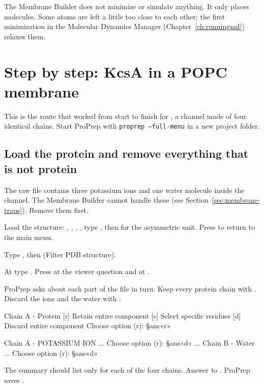 \begin{behindscenes}
The Membrane Builder does not minimize or simulate anything. It only places
molecules. Some atoms are left a little too close to each other; the first
minimization in the Molecular Dynamics Manager (Chapter~\ref{ch:runningmd})
relaxes them.
\end{behindscenes}

\section{Step by step: KcsA in a POPC membrane}
\label{sec:membrane-steps}

This is the route that worked from start to finish for , a channel
made of four identical chains. Start ProPrep with \texttt{proprep --full-menu}
in a new project folder.

\subsection{Load the protein and remove everything that is not protein}
\label{sec:membrane-filter}

The raw  file contains three potassium ions and one water molecule
inside the channel. The Membrane Builder cannot handle these (see
Section~\ref{sec:membrane-traps}). Remove them first.

\begin{steps}
  \item Load the structure: , , , , type
        , then  for the asymmetric unit. Press  to
        return to the main menu.
  \item Type , then  (\textsf{Filter PDB structure}).
  \item At  type .
        Press  at the viewer question and at
        .
  \item ProPrep asks about each part of the file in turn. Keep every protein
        chain with . Discard the ions and the water with :
\begin{screen}
Chain A - Protein
[r] Retain entire component
[s] Select specific residues
[d] Discard entire component
Choose option (r): §ans«r»

Chain A - POTASSIUM ION
...
Choose option (r): §ans«d»
...
Chain B - Water
...
Choose option (r): §ans«d»
\end{screen}
  \item The summary should list only  for each
        of the four chains. Answer  to
        . ProPrep saves
        .
\end{steps}

